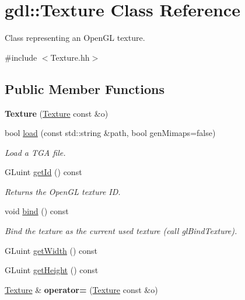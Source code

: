 \hypertarget{classgdl_1_1_texture}{\section{gdl\-:\-:Texture Class Reference}
\label{classgdl_1_1_texture}
}


Class representing an Open\-G\-L texture.  




{\ttfamily \#include $<$Texture.\-hh$>$}

\subsection*{Public Member Functions}
\begin{DoxyCompactItemize}
\item 
\hypertarget{classgdl_1_1_texture_a2d010f85c81be8c5b19cf7b4f0ae1af0}{{\bfseries Texture} (\hyperlink{classgdl_1_1_texture}{Texture} const \&o)}\label{classgdl_1_1_texture_a2d010f85c81be8c5b19cf7b4f0ae1af0}

\item 
bool \hyperlink{classgdl_1_1_texture_ada7dffc24ec794f7cc5a5a26dc0261fc}{load} (const std\-::string \&path, bool gen\-Mimaps=false)
\begin{DoxyCompactList}\small\item\em Load a T\-G\-A file. \end{DoxyCompactList}\item 
G\-Luint \hyperlink{classgdl_1_1_texture_a1954740f65f3e9265d6f4506ec75f4c2}{get\-Id} () const 
\begin{DoxyCompactList}\small\item\em Returns the Open\-G\-L texture I\-D. \end{DoxyCompactList}\item 
\hypertarget{classgdl_1_1_texture_a5b628612f89e1fc67a28085158236d9c}{void \hyperlink{classgdl_1_1_texture_a5b628612f89e1fc67a28085158236d9c}{bind} () const }\label{classgdl_1_1_texture_a5b628612f89e1fc67a28085158236d9c}

\begin{DoxyCompactList}\small\item\em Bind the texture as the current used texture (call gl\-Bind\-Texture). \end{DoxyCompactList}\item 
G\-Luint \hyperlink{classgdl_1_1_texture_a932fca1cf9da4570df0591ae2272f545}{get\-Width} () const 
\item 
G\-Luint \hyperlink{classgdl_1_1_texture_a7ffaf22e021293cab2a856c2ec795dca}{get\-Height} () const 
\item 
\hypertarget{classgdl_1_1_texture_afc8d4545507f62b5273f938dce5dfeba}{\hyperlink{classgdl_1_1_texture}{Texture} \& {\bfseries operator=} (\hyperlink{classgdl_1_1_texture}{Texture} const \&o)}\label{classgdl_1_1_texture_afc8d4545507f62b5273f938dce5dfeba}

\end{DoxyCompactItemize}
